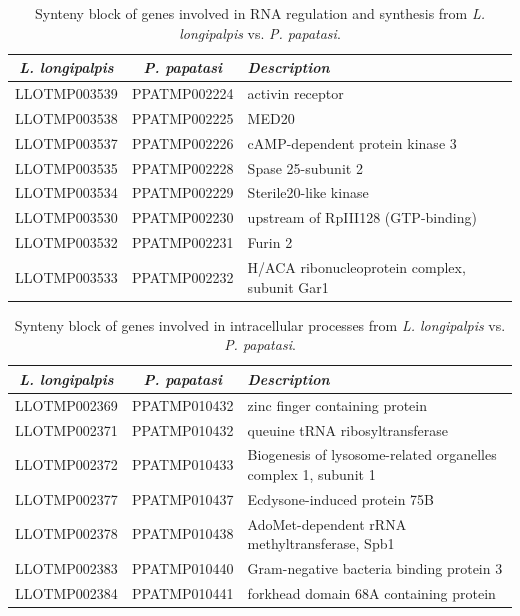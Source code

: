\begin{table}[H]
  \centering
  \begin{tabular}{c c l} \hline
    \emph{L. longipalpis} & \emph{P. papatasi} & \emph{Description} \\ \hline
    LLOTMP003539 & PPATMP002224 & activin receptor \\
    LLOTMP003538 & PPATMP002225 & MED20 \\
    LLOTMP003537 & PPATMP002226 & cAMP-dependent protein kinase 3 \\
    LLOTMP003535 & PPATMP002228 & Spase 25-subunit 2 \\
    LLOTMP003534 & PPATMP002229 & Sterile20-like kinase \\
    LLOTMP003530 & PPATMP002230 & upstream of RpIII128 (GTP-binding) \\
    LLOTMP003532 & PPATMP002231 & Furin 2 \\
    LLOTMP003533 & PPATMP002232 & H/ACA ribonucleoprotein complex, subunit Gar1
    \end{tabular}
    \caption{Synteny block of genes involved in RNA regulation and synthesis from \emph{L. longipalpis} vs. \emph{P. papatasi}.}
  \label{tab:synteny-llot-ppat-rna}
\end{table}

\begin{table}[H]
  \centering
  \begin{tabular}{c c l} \hline
    \emph{L. longipalpis} & \emph{P. papatasi} & \emph{Description} \\ \hline
    LLOTMP002369 & PPATMP010432 & zinc finger containing protein \\
    LLOTMP002371 & PPATMP010432 & queuine tRNA ribosyltransferase \\
    LLOTMP002372 & PPATMP010433 & Biogenesis of lysosome-related organelles complex 1, subunit 1 \\
    LLOTMP002377 & PPATMP010437 & Ecdysone-induced protein 75B \\
    LLOTMP002378 & PPATMP010438 & AdoMet-dependent rRNA methyltransferase, Spb1 \\
    LLOTMP002383 & PPATMP010440 & Gram-negative bacteria binding protein 3 \\
    LLOTMP002384 & PPATMP010441 & forkhead domain 68A containing protein
    \end{tabular}
    \caption{Synteny block of genes involved in intracellular processes from \emph{L. longipalpis} vs. \emph{P. papatasi}.}
  \label{tab:synteny-llot-ppat-intracellular}
\end{table}

